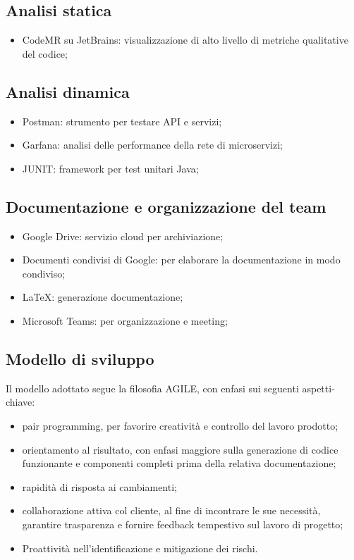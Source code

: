 \subsection{Analisi statica}
\begin{itemize}
	\item CodeMR su JetBrains: visualizzazione di alto livello di metriche qualitative del codice;
\end{itemize}

\subsection{Analisi dinamica}
\begin{itemize}
	\item Postman: strumento per testare API e servizi;
	\item Garfana: analisi delle performance della rete di microservizi;
	\item JUNIT: framework per test unitari Java;
\end{itemize}

\subsection{Documentazione e organizzazione del team}
\begin{itemize}
	\item Google Drive: servizio cloud per archiviazione;
	\item Documenti condivisi di Google: per elaborare la documentazione in modo condiviso;
	\item \LaTeX: generazione documentazione;
	\item Microsoft Teams: per organizzazione e meeting;
\end{itemize}

\subsection{Modello di sviluppo}
Il modello adottato segue la filosofia AGILE, con enfasi sui seguenti aspetti-chiave:
\begin{itemize}
	\item pair programming, per favorire creatività e controllo del lavoro prodotto;
	\item orientamento al risultato, con enfasi maggiore sulla generazione di codice funzionante e componenti completi prima della relativa documentazione;
	\item rapidità di risposta ai cambiamenti;
	\item collaborazione attiva col cliente, al fine di incontrare le sue necessità, garantire trasparenza e fornire feedback tempestivo sul lavoro di progetto;
	\item Proattività nell’identificazione e mitigazione dei rischi.
\end{itemize}

\clearpage